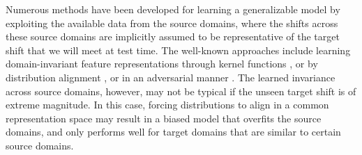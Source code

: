 \documentclass[journal]{IEEEtran}
\begin{document}
Numerous methods have been developed for learning a generalizable model by exploiting the available data from the source domains,
where the shifts across these source domains are implicitly assumed to be representative of the target shift that we will meet at test time. 
The well-known approaches include learning domain-invariant feature representations through kernel functions \cite{blanchard2011generalizing,muandet2013domain,ghifary2016scatter,blanchard2017domain,grubinger2015domain,li2018domain2,hu2020domain}, or by distribution alignment \cite{zhou2020domain,peng2019moment,motiian2017unified}, or in an adversarial manner \cite{li2018domain,Gong_2019_CVPR,li2018deep,shao2019multi,rahman2020correlation}.
The learned invariance across source domains, however, may not be typical if the unseen target shift is of extreme magnitude.
In this case, forcing distributions to align in a common representation space may result in a biased model that overfits the source domains,
and only performs well for target domains that are similar to certain source domains.
\end{document}
